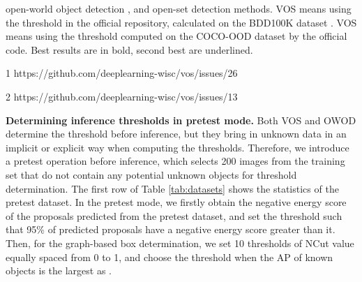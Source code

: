 \documentclass[10pt,twocolumn,letterpaper]{article}
\newcommand{\xf}[1]{{\color{black} #1}}
\begin{document}
\begin{table*}
\begin{threeparttable}
{open-world object detection ,
and open-set detection  methods. 
VOS means using the threshold in the official repository,
calculated on the BDD100K dataset \cite{yu2020bdd100k}.
VOS means using the threshold computed on the COCO-OOD dataset by the official code.
Best results are in bold,
second best are underlined.}
\begin{tablenotes}
\scriptsize
\item[1] https://github.com/deeplearning-wisc/vos/issues/26
\item[2] https://github.com/deeplearning-wisc/vos/issues/13
\end{tablenotes}
\end{threeparttable}
\label{tab:all_result}
\vspace{-0.5em}
\end{table*}

\noindent\textbf{Determining inference thresholds in pretest mode.}
Both VOS \cite{vos} and OWOD \cite{owod} determine \xf{the} threshold before inference,
but they bring in unknown data in an implicit or explicit way when computing the thresholds.
Therefore, we introduce a pretest operation before inference,
which \xf{selects 200 images from} the training set that do not contain any potential unknown objects for threshold determination.
The first row of Table \ref{tab:datasets} shows the statistics of the pretest dataset.
In the pretest mode,
we firstly obtain the negative energy score of the proposals predicted from the pretest dataset,
and set the threshold  such that 95\% of predicted proposals have a negative energy score greater than it.
Then,
for the graph-based box determination,
we set 10 thresholds of NCut value equally spaced from 0 to 1,
and choose the threshold when the AP of known objects is the largest as .
\end{document}
